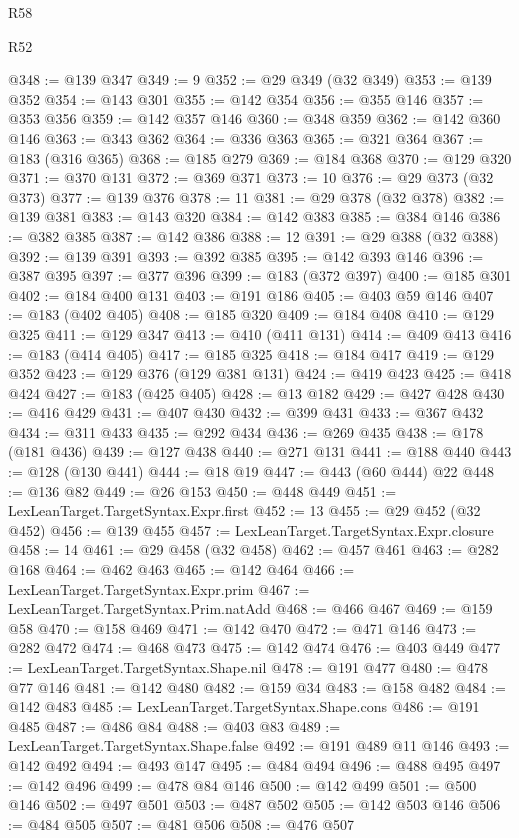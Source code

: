 \begin{lexlean}{R58}
\begin{lexlean}{R52}
\begin{coremodule}
{{{{{{{{{{{{{{{{{{{{{{{{{{{{{{{{{{{{{{{{{{{{{{{{{{{{{{{{{{{{{{{{{{{{{{{{{{{{{{{{{{{{{{{{{{{{{{{{{{{{{{{{{{{{{{{{{{{{{{{{{{{{{{{{{{{{{{{{{{{{{{{{{{{{{{{{{{{{{{{{{{{{{{{{{{{{{{{{{{{{{{{{{{{{{{{{{{{{{{@348 := @139 @347
@349 := 9
@352 := @29 @349 (@32 @349)
@353 := @139 @352
@354 := @143 @301
@355 := @142 @354
@356 := @355 @146
@357 := @353 @356
@359 := @142 @357 @146
@360 := @348 @359
@362 := @142 @360 @146
@363 := @343 @362
@364 := @336 @363
@365 := @321 @364
@367 := @183 (@316 @365)
@368 := @185 @279
@369 := @184 @368
@370 := @129 @320
@371 := @370 @131
@372 := @369 @371
@373 := 10
@376 := @29 @373 (@32 @373)
@377 := @139 @376
@378 := 11
@381 := @29 @378 (@32 @378)
@382 := @139 @381
@383 := @143 @320
@384 := @142 @383
@385 := @384 @146
@386 := @382 @385
@387 := @142 @386
@388 := 12
@391 := @29 @388 (@32 @388)
@392 := @139 @391
@393 := @392 @385
@395 := @142 @393 @146
@396 := @387 @395
@397 := @377 @396
@399 := @183 (@372 @397)
@400 := @185 @301
@402 := @184 @400 @131
@403 := @191 @186
@405 := @403 @59 @146
@407 := @183 (@402 @405)
@408 := @185 @320
@409 := @184 @408
@410 := @129 @325
@411 := @129 @347
@413 := @410 (@411 @131)
@414 := @409 @413
@416 := @183 (@414 @405)
@417 := @185 @325
@418 := @184 @417
@419 := @129 @352
@423 := @129 @376 (@129 @381 @131)
@424 := @419 @423
@425 := @418 @424
@427 := @183 (@425 @405)
@428 := @13 @182
@429 := @427 @428
@430 := @416 @429
@431 := @407 @430
@432 := @399 @431
@433 := @367 @432
@434 := @311 @433
@435 := @292 @434
@436 := @269 @435
@438 := @178 (@181 @436)
@439 := @127 @438
@440 := @271 @131
@441 := @188 @440
@443 := @128 (@130 @441)
@444 := @18 @19
@447 := @443 (@60 @444) @22
@448 := @136 @82
@449 := @26 @153
@450 := @448 @449
@451 := LexLeanTarget.TargetSyntax.Expr.first
@452 := 13
@455 := @29 @452 (@32 @452)
@456 := @139 @455
@457 := LexLeanTarget.TargetSyntax.Expr.closure
@458 := 14
@461 := @29 @458 (@32 @458)
@462 := @457 @461
@463 := @282 @168
@464 := @462 @463
@465 := @142 @464
@466 := LexLeanTarget.TargetSyntax.Expr.prim
@467 := LexLeanTarget.TargetSyntax.Prim.natAdd
@468 := @466 @467
@469 := @159 @58
@470 := @158 @469
@471 := @142 @470
@472 := @471 @146
@473 := @282 @472
@474 := @468 @473
@475 := @142 @474
@476 := @403 @449
@477 := LexLeanTarget.TargetSyntax.Shape.nil
@478 := @191 @477
@480 := @478 @77 @146
@481 := @142 @480
@482 := @159 @34
@483 := @158 @482
@484 := @142 @483
@485 := LexLeanTarget.TargetSyntax.Shape.cons
@486 := @191 @485
@487 := @486 @84
@488 := @403 @83
@489 := LexLeanTarget.TargetSyntax.Shape.false
@492 := @191 @489 @11 @146
@493 := @142 @492
@494 := @493 @147
@495 := @484 @494
@496 := @488 @495
@497 := @142 @496
@499 := @478 @84 @146
@500 := @142 @499
@501 := @500 @146
@502 := @497 @501
@503 := @487 @502
@505 := @142 @503 @146
@506 := @484 @505
@507 := @481 @506
@508 := @476 @507
}}}}}}}}}}}}}}}}}}}}}}}}}}}}}}}}}}}}}}}}}}}}}}}}}}}}}}}}}}}}}}}}}}}}}}}}}}}}}}}}}}}}}}}}}}}}}}}}}}}}}}}}}}}}}}}}}}}}}}}}}}}}}}}}}}}}}}}}}}}}}}}}}}}}}}}}}}}}}}}}}}}}}}}}}}}}}}}}}}}}}}}}}}}}}}}}}}}}}}
\end{coremodule}
\end{lexlean}
\end{lexlean}
